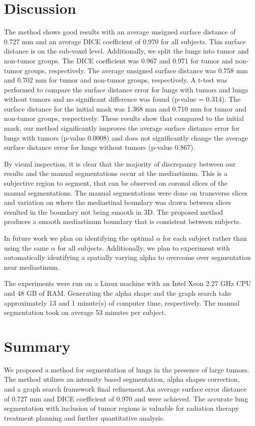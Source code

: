 \documentclass{llncs}
\begin{document}
%
\section{Discussion}
%

The method shows good results with an average unsigned surface distance of 0.727 mm and an average DICE coefficient of 0.970 for all subjects. This surface distance is on the sub-voxel level. Additionally, we split the lungs into tumor and non-tumor groups. The DICE coefficient was 0.967 and 0.971 for tumor and non-tumor groups, respectively. The average unsigned surface distance was 0.758 mm and 0.702 mm for tumor and non-tumor groups, respectively. A t-test was performed to compare the surface distance error for lungs with tumors and lungs without tumors and no significant difference was found (p-value = 0.314). The surface distance for the initial mask was 1.368 mm and 0.710 mm for tumor and non-tumor groups, respectively. These results show that compared to the initial mask, our method significantly improves the average surface distance error for lungs with tumors (p-value 0.0008) and does not significantly change the average surface distance error for lungs without tumors (p-value 0.867).

By visual inspection, it is clear that the majority of discrepancy between our results and the manual segmentations occur at the mediastinum. This is a subjective region to segment, that can be observed on coronal slices of the manual segmentations. The manual segmentations were done on transverse slices and variation on where the mediastinal boundary was drawn between slices resulted in the boundary not being smooth in 3D. The proposed method produces a smooth mediastinum boundary that is consistent between subjects. 

In future work we plan on identifying the optimal $\alpha$ for each subject rather than using the same $\alpha$ for all subjects. Additionally, we plan to experiment with automatically identifying a spatially varying alpha to overcome over segmentation near mediastinum.

The experiments were run on a Linux machine with an Intel Xeon 2.27 GHz CPU and 48 GB of RAM. Generating the alpha shape and the graph search take approximately 13 and 1 minute(s) of computer time, respectively. The manual segmentation took on average 53 minutes per subject.
%
\section{Summary}
%
We proposed a method for segmentation of lungs in the presence of large tumors. The method utilizes an intensity based segmentation, alpha shapes correction, and a graph search framework final refinement.An average surface error distance of 0.727 mm and DICE coefficient of 0.970 and  were achieved. The accurate lung segmentation with  inclusion of tumor regions is valuable for radiation therapy treatment planning and further quantitative analysis.
%
\end{document}
